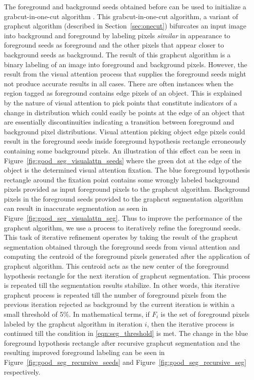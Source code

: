 \documentclass {udthesis}
\begin{document}
The foreground and background seeds obtained before can be used to initialize a grabcut-in-one-cut algorithm \cite{onecut}. This grabcut-in-one-cut algorithm, a variant of graphcut algorithm (described in Section~\ref{sec:onecut}) bifurcates an input image into background and foreground by labeling pixels \textit{similar} in appearance to foreground seeds as foreground and the other pixels that appear closer to background seeds as background. The result of this graphcut algorithm is a binary labeling of an image into foreground and background pixels. 
However, the result from the visual attention process that supplies the foreground seeds might not produce accurate results in all cases. There are often instances when the region tagged as foreground contains edge pixels of an object. This is explained by the nature of visual attention to pick points that constitute indicators of a change in distribution which could easily be points at the edge of an object that are essentially discontinuities indicating a transition between foreground and background pixel distributions. Visual attention picking object edge pixels could result in the foreground seeds inside foreground hypothesis rectangle erroneously containing some background pixels. An illustration of this effect can be seen in Figure~\ref{fig:good_seg_visualattn_seeds} where the green dot at the edge of the object is the determined visual attention fixation. The blue foreground hypothesis rectangle around the fixation point contains some wrongly labeled background pixels provided as input foreground pixels to the graphcut algorithm. Background pixels in the foreground seeds provided to the graphcut segmentation algorithm can result in inaccurate segmentation as seen in Figure~\ref{fig:good_seg_visualattn_seg}. Thus to improve the performance of the graphcut algorithm, we use a process to iteratively refine the foreground seeds. This task of iterative refinement operates by taking the result of the graphcut segmentation obtained through the foreground seeds from visual attention and computing the centroid of the foreground pixels generated after the application of graphcut algorithm. This centroid acts as the new center of the foreground hypothesis rectangle for the next iteration of graphcut segmentation. This process is repeated till the segmentation results stabilize. In other words, this iterative graphcut process is repeated 
till the number of foreground pixels from the previous iteration rejected as background by the current iteration is within a small threshold of 5\%. In mathematical terms, if $F_i$ is the set of foreground pixels labeled by the graphcut algorithm in iteration $i$, then the iterative process is continued till the condition in \eqref{eqn:seg_threshold} is met. The change in the blue foreground hypothesis rectangle after recursive graphcut segmentation and the resulting improved foreground labeling can be seen in Figure~\ref{fig:good_seg_recursive_seeds} and Figure~\ref{fig:good_seg_recursive_seg} respectively.
\end{document}
